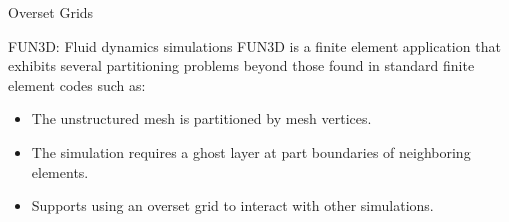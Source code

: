 \documentclass{beamer}
\begin{document}
\begin{textblock}{15.6}
\begin{textblock}{5}
\begin{block}{Overset Grids}
      
    \end{block}
    
    \begin{block}{FUN3D: Fluid dynamics simulations}
      FUN3D is a finite element application that exhibits several partitioning problems beyond those found in standard finite element codes such as:
      \begin{itemize}
      \item The unstructured mesh is partitioned by mesh vertices.
      \item The simulation requires a ghost layer at part boundaries of neighboring elements.
      \item Supports using an overset grid to interact with other simulations.
      \end{itemize}



      
    \end{block}
  \end{textblock}
\end{textblock}
\end{document}
